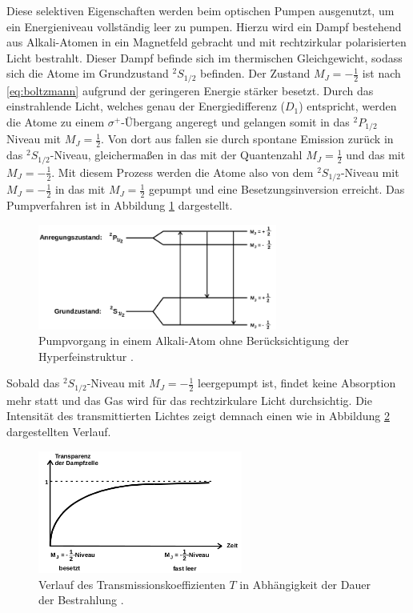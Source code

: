 Diese selektiven Eigenschaften werden beim optischen Pumpen ausgenutzt, um ein Energieniveau vollständig leer zu pumpen.
Hierzu wird ein Dampf bestehend aus Alkali-Atomen in ein Magnetfeld gebracht und mit rechtzirkular polarisierten Licht bestrahlt.
Dieser Dampf befinde sich im thermischen Gleichgewicht, sodass sich die Atome im Grundzustand $^2S_{1/2}$ befinden.
Der Zustand $M_J = -\frac{1}{2}$ ist nach \eqref{eq:boltzmann} aufgrund der geringeren Energie stärker besetzt.
Durch das einstrahlende Licht, welches genau der Energiedifferenz ($D_1$) entspricht, werden die Atome zu einem $\sigma^{+}$-Übergang angeregt und gelangen somit in das $^2P_{1/2}$ Niveau mit $M_J=\frac{1}{2}$.
Von dort aus fallen sie durch spontane Emission zurück in das $^2S_{1/2}$-Niveau, gleichermaßen in das mit der Quantenzahl $M_J = \frac{1}{2}$ und das mit $M_J=-\frac{1}{2}$.
Mit diesem Prozess werden die Atome also von dem $^2S_{1/2}$-Niveau mit $M_J=-\frac{1}{2}$ in das mit $M_J=\frac{1}{2}$ gepumpt und eine Besetzungsinversion erreicht.
Das Pumpverfahren ist in Abbildung \ref{fig:tfig4} dargestellt.
\FloatBarrier
\begin{figure}[h]
    \centering
    \includegraphics[width=0.7\textwidth]{pumpen.png}
    \caption{Pumpvorgang in einem Alkali-Atom ohne Berücksichtigung der Hyperfeinstruktur \cite{quelle01}.}
    \label{fig:tfig4}
\end{figure}
\FloatBarrier
\noindent
Sobald das $^2S_{1/2}$-Niveau mit $M_J=-\frac{1}{2}$ leergepumpt ist, findet keine Absorption mehr statt und das Gas wird für das rechtzirkulare Licht durchsichtig.
Die Intensität des transmittierten Lichtes zeigt demnach einen wie in Abbildung \ref{fig:tfig5} dargestellten Verlauf.
\FloatBarrier
\begin{figure}[h]
    \centering
    \includegraphics[width=0.6\textwidth]{transmission.png}
    \caption{Verlauf des Transmissionskoeffizienten $T$ in Abhängigkeit der Dauer der Bestrahlung \cite{quelle01}.}
    \label{fig:tfig5}
\end{figure}
\FloatBarrier
\noindent

